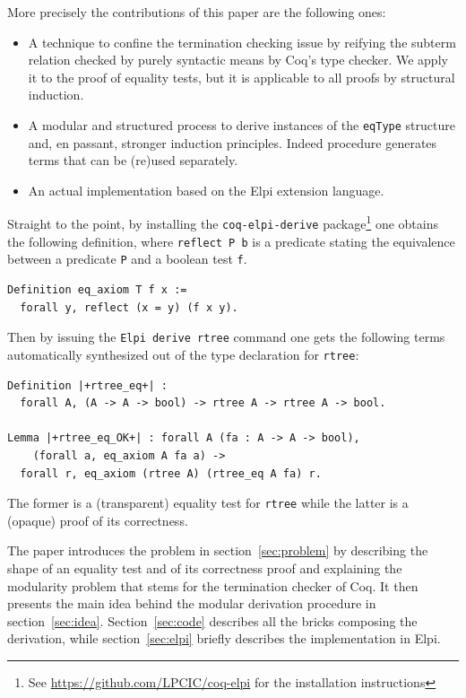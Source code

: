 \documentclass[sigplan,10pt,review]{acmart}\settopmatter{printfolios=true,printccs=false,printacmref=false}
\begin{document}
More precisely the contributions of this paper are the following ones:
\begin{itemize}
\item A technique to confine the termination checking
	issue by reifying the subterm relation checked by purely syntactic
	means by Coq's type checker. We apply it to the proof of equality
	tests, but it is applicable to all proofs by structural
	induction.

\item A modular and structured process to derive instances of the
	\lstinline+eqType+ structure and, en passant, stronger
	induction principles. Indeed procedure generates
	terms that can be (re)used separately.

\item An actual implementation based on the Elpi extension language.
\end{itemize}

\noindent
Straight to the point, by installing the \lstinline+coq-elpi-derive+
package\footnote{See \url{https://github.com/LPCIC/coq-elpi} for the
installation instructions} 
one obtains the following definition, where \lstinline+reflect P b+
is a predicate stating the equivalence between a predicate
\lstinline+P+ and a boolean test \lstinline+f+.

\begin{lstlisting}
Definition eq_axiom T f x :=
  forall y, reflect (x = y) (f x y).
\end{lstlisting}

\noindent
Then by issuing the \lstinline+Elpi derive rtree+ command one gets
the following terms automatically synthesized out of the type
declaration for \lstinline+rtree+:

\begin{lstlisting}
Definition |+rtree_eq+| :
  forall A, (A -> A -> bool) -> rtree A -> rtree A -> bool.

Lemma |+rtree_eq_OK+| : forall A (fa : A -> A -> bool),
    (forall a, eq_axiom A fa a) ->
  forall r, eq_axiom (rtree A) (rtree_eq A fa) r.
\end{lstlisting}

\noindent
The former is a (transparent) equality test for \lstinline+rtree+
while the latter is a (opaque) proof of its correctness.

The paper introduces the problem in
section~\ref{sec:problem} by describing the shape of an equality test
and of its correctness proof and explaining the modularity problem
that stems for the termination checker of Coq. It then
presents the main idea behind the
modular derivation procedure in section~\ref{sec:idea}.
Section~\ref{sec:code} describes all the bricks composing the
derivation, while section~\ref{sec:elpi} briefly describes the
implementation in Elpi.
\end{document}
